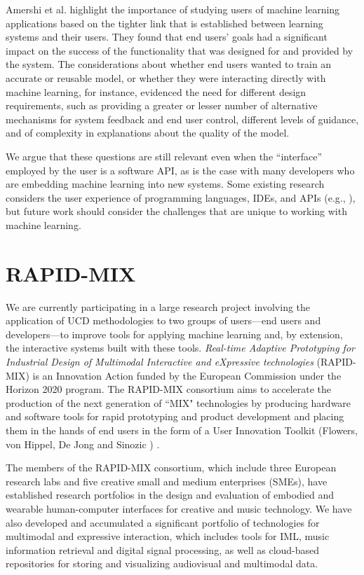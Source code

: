 \documentclass[letterpaper]{article}
\begin{document}
Amershi et al. \citeyear{amershi2014power} highlight the importance of studying users of machine learning applications based on the tighter link that is established between learning systems and their users. They found that end users' goals had a significant impact on the success of the functionality that was designed for and provided by the system. The considerations about whether end users wanted to train an accurate or reusable model, or whether they were interacting directly with machine learning, for instance, evidenced the need for different design requirements, such as providing a greater or lesser number of alternative mechanisms for system feedback and end user control, different levels of guidance, and of complexity in explanations about the quality of the model.

We argue that these questions are still relevant even when the ``interface'' employed by the user is a software API, as is the case with many developers who are embedding machine learning into new systems. Some existing research considers the user experience of programming languages, IDEs, and APIs (e.g., \cite{ko2011role}), but future work should consider the challenges that are unique to working with machine learning.

\section{RAPID-MIX}
We are currently participating in a large research project involving the application of UCD methodologies to two groups of users---end users and developers---to improve tools for applying machine learning and, by extension, the interactive systems built with these tools. \textit{Real-time Adaptive Prototyping for Industrial Design of Multimodal Interactive and eXpressive technologies} (RAPID-MIX) is an Innovation Action funded by the European Commission under the Horizon 2020 program. The RAPID-MIX consortium aims to accelerate the production of the next generation of ``MIX" technologies by producing hardware and software tools for rapid prototyping and product development and placing them in the hands of end users in the form of a User Innovation Toolkit (Flowers, von Hippel, De Jong and Sinozic \citeyear{flowers2010measuring}) . 

The members of the RAPID-MIX consortium, which include three European research labs and five creative small and medium enterprises (SMEs), have established research portfolios in the design and evaluation of embodied and wearable human-computer interfaces for creative and music technology. We have also developed and accumulated a significant portfolio of technologies for multimodal and expressive interaction, which includes tools for IML, music information retrieval and digital signal processing, as well as cloud-based repositories for storing and visualizing audiovisual and multimodal data.
\end{document}
